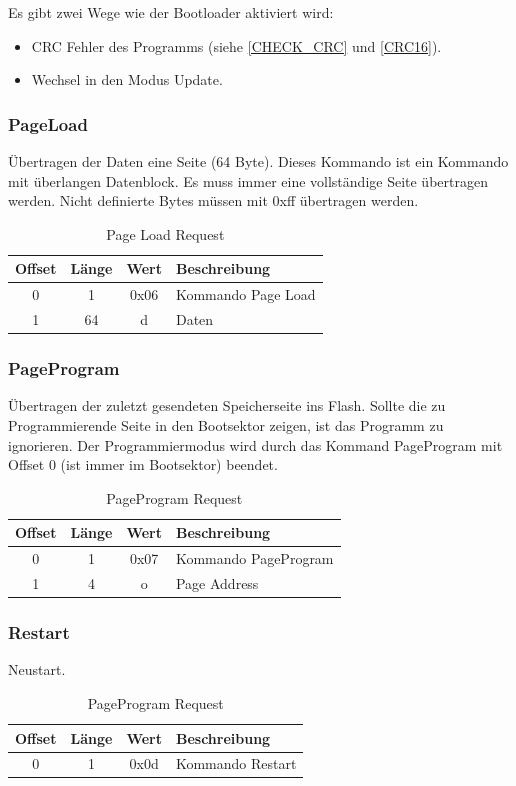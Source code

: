 \documentclass[10pt,a4paper]{article}
\begin{document}
Es gibt zwei Wege wie der Bootloader aktiviert wird:
\begin{itemize}
 \item CRC Fehler des Programms (siehe \ref{CHECK_CRC} und \ref{CRC16}).
 \item Wechsel in den Modus Update. 
\end{itemize}
  
\subsubsection{PageLoad}
\label{sec:PageLoad}
Übertragen der Daten eine Seite (64 Byte). Dieses Kommando ist ein Kommando mit überlangen Datenblock. Es muss immer eine vollständige Seite übertragen werden. Nicht definierte Bytes müssen mit 0xff übertragen werden.
\begin{table}[H]
\centering
\begin{tabular}{c|c|c|l}
\textbf{Offset} & \textbf{Länge} & \textbf{Wert} & \textbf{Beschreibung} \\ \hline
0 & 1 & 0x06 & Kommando Page Load\\
1 & 64 & d & Daten
\end{tabular}
\caption{Page Load Request}
\end{table}

\subsubsection{PageProgram}
\label{sec:PageProgram}
Übertragen der zuletzt gesendeten Speicherseite ins Flash. Sollte die zu Programmierende Seite in den Bootsektor zeigen, ist das Programm zu ignorieren. Der Programmiermodus wird durch das Kommand PageProgram mit Offset 0 (ist immer im Bootsektor) beendet.
\begin{table}[H]
\centering
\begin{tabular}{c|c|c|l}
\textbf{Offset} & \textbf{Länge} & \textbf{Wert} & \textbf{Beschreibung} \\ \hline
0 & 1 & 0x07 & Kommando PageProgram\\
1 & 4 & o & Page Address
\end{tabular}
\caption{PageProgram Request}
\end{table}

\subsubsection{Restart}
\label{sec:Restart}
Neustart.
\begin{table}[H]
\centering
\begin{tabular}{c|c|c|l}
\textbf{Offset} & \textbf{Länge} & \textbf{Wert} & \textbf{Beschreibung} \\ \hline
0 & 1 & 0x0d & Kommando Restart\\
\end{tabular}
\caption{PageProgram Request}
\end{table}
\end{document}
